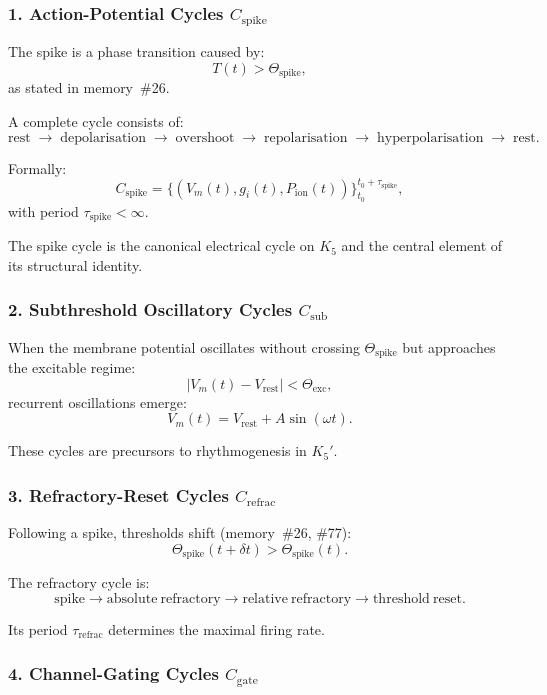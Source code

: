 \subsubsection{1. Action-Potential Cycles $C_{\mathrm{spike}}$}

The spike is a phase transition caused by:
\[
  T(t) > \Theta_{\mathrm{spike}},
\]
as stated in memory~\#26.

A complete cycle consists of:
\[
  \mathrm{rest} 
  \;\to\;
  \mathrm{depolarisation}
  \;\to\;
  \mathrm{overshoot}
  \;\to\;
  \mathrm{repolarisation}
  \;\to\;
  \mathrm{hyperpolarisation}
  \;\to\;
  \mathrm{rest}.
\]

Formally:
\[
  C_{\mathrm{spike}}
  =\{(V_m(t), g_i(t), P_{\mathrm{ion}}(t))\}_{t_0}^{t_0+\tau_{\mathrm{spike}}},
\]
with period $\tau_{\mathrm{spike}} < \infty$.

The spike cycle is the canonical electrical cycle on $K_5$ and the 
central element of its structural identity.

\subsubsection{2. Subthreshold Oscillatory Cycles $C_{\mathrm{sub}}$}

When the membrane potential oscillates without crossing 
$\Theta_{\mathrm{spike}}$ but approaches the excitable regime:
\[
  |V_m(t) - V_{\mathrm{rest}}| < \Theta_{\mathrm{exc}},
\]
recurrent oscillations emerge:
\[
  V_m(t) = V_{\mathrm{rest}} + A\sin(\omega t).
\]

These cycles are precursors to rhythmogenesis in $K_5'$.

\subsubsection{3. Refractory-Reset Cycles $C_{\mathrm{refrac}}$}

Following a spike, thresholds shift (memory~\#26, \#77):
\[
  \Theta_{\mathrm{spike}}(t+\delta t)
  >
  \Theta_{\mathrm{spike}}(t).
\]

The refractory cycle is:
\[
  \mathrm{spike} 
  \to 
  \mathrm{absolute\ refractory}
  \to
  \mathrm{relative\ refractory}
  \to
  \mathrm{threshold\ reset}.
\]

Its period $\tau_{\mathrm{refrac}}$ determines the maximal firing rate.

\subsubsection{4. Channel-Gating Cycles $C_{\mathrm{gate}}$}

